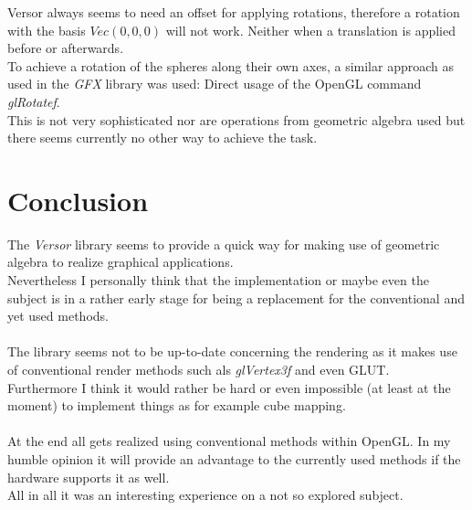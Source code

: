 \documentclass[pdftex,12pt,a4paper]{article}
\begin{document}
Versor always seems to need an offset for applying rotations, therefore a rotation with the basis $ Vec(0, 0, 0) $ will not work. Neither when a translation is applied before or afterwards.\\
To achieve a rotation of the spheres along their own axes, a similar approach as used in the \textit{GFX} library was used: Direct usage of the OpenGL command \textit{glRotatef}.\\
This is not very sophisticated nor are operations from geometric algebra used but there seems currently no other way to achieve the task.

\section{Conclusion}
The \textit{Versor} library seems to provide a quick way for making use of geometric algebra to realize graphical applications.\\
Nevertheless I personally think that the implementation or maybe even the subject is in a rather early stage for being a replacement for the conventional and yet used methods.\\
\\
The library seems not to be up-to-date concerning the rendering as it makes use of conventional render methods such als \textit{glVertex3f} and even \gls{GLUT}.\\
Furthermore I think it would rather be hard or even impossible (at least at the moment) to implement things as for example \gls{cube mapping}.\\
\\
At the end all gets realized using conventional methods within OpenGL. In my humble opinion it will provide an advantage to the currently used methods if the hardware supports it as well.\\
All in all it was an interesting experience on a not so explored subject.

\printglossary[numberedsection]
\end{document}

